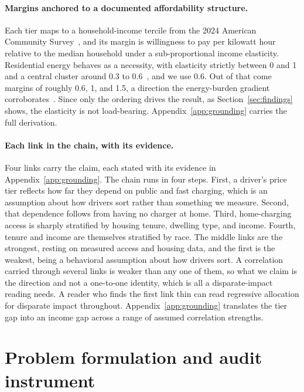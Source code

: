 \documentclass[manuscript, screen, review, anonymous]{acmart}
\begin{document}
\paragraph{Margins anchored to a documented affordability structure.}
Each tier maps to a household-income tercile from the 2024 American Community Survey~\cite{acs2024}, and its margin is willingness to pay per kilowatt hour relative to the median household under a sub-proportional income elasticity. Residential energy behaves as a necessity, with elasticity strictly between 0 and 1 and a central cluster around 0.3 to 0.6~\cite{schulte2017price,espey2004turning}, and we use 0.6. Out of that come margins of roughly 0.6, 1, and 1.5, a direction the energy-burden gradient corroborates~\cite{drehobl2020high}. Since only the ordering drives the result, as Section~\ref{sec:findings} shows, the elasticity is not load-bearing. Appendix~\ref{app:grounding} carries the full derivation.

\paragraph{Each link in the chain, with its evidence.}
Four links carry the claim, each stated with its evidence in Appendix~\ref{app:grounding}. The chain runs in four steps. First, a driver's price tier reflects how far they depend on public and fast charging, which is an assumption about how drivers sort rather than something we measure. Second, that dependence follows from having no charger at home. Third, home-charging access is sharply stratified by housing tenure, dwelling type, and income. Fourth, tenure and income are themselves stratified by race. The middle links are the strongest, resting on measured access and housing data, and the first is the weakest, being a behavioral assumption about how drivers sort. A correlation carried through several links is weaker than any one of them, so what we claim is the direction and not a one-to-one identity, which is all a disparate-impact reading needs. A reader who finds the first link thin can read regressive allocation for disparate impact throughout. Appendix~\ref{app:grounding} translates the tier gap into an income gap across a range of assumed correlation strengths.

\section{Problem formulation and audit instrument}
\label{sec:problem}
\end{document}
